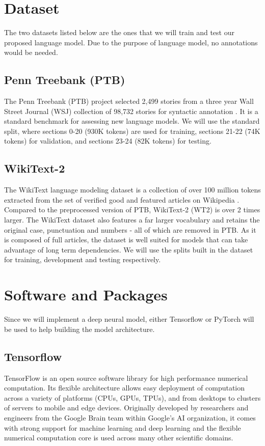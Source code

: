\documentclass[11pt,a4paper]{article}
\begin{document}
\section{Dataset}
\label{sec:dataset}
The two datasets listed below are the ones that we will train and test our proposed language model. Due to the purpose of language model, no annotations would be needed.

\subsection{Penn Treebank (PTB)}
\label{subsec:penn_treebank}
The Penn Treebank (PTB) project selected 2,499 stories from a three year Wall Street Journal (WSJ) collection of 98,732 stories for syntactic annotation \citep{marcus1993building}. It is a standard benchmark for assessing new language models. We will use the standard split, where sections 0-20 (930K tokens) are used for training, sections 21-22 (74K tokens) for validation, and sections 23-24 (82K tokens) for testing.

\subsection{WikiText-2}
\label{subsec:wikitext2}
The WikiText language modeling dataset is a collection of over 100 million tokens extracted from the set of verified good and featured articles on Wikipedia \citep{merity2016pointer}. Compared to the preprocessed version of PTB, WikiText-2 (WT2) is over 2 times larger. The WikiText dataset also features a far larger vocabulary and retains the original case, punctuation and numbers - all of which are removed in PTB. As it is composed of full articles, the dataset is well suited for models that can take advantage of long term dependencies. We will use the splits built in the dataset for training, development and testing respectively.

\section{Software and Packages}
\label{software_package}
Since we will implement a deep neural model, either Tensorflow or PyTorch will be used to help building the model architecture.

\subsection{Tensorflow}
\label{subsec:tensorflow}
TensorFlow is an open source software library for high performance numerical computation. Its flexible architecture allows easy deployment of computation across a variety of platforms (CPUs, GPUs, TPUs), and from desktops to clusters of servers to mobile and edge devices. Originally developed by researchers and engineers from the Google Brain team within Google’s AI organization, it comes with strong support for machine learning and deep learning and the flexible numerical computation core is used across many other scientific domains.
\end{document}
